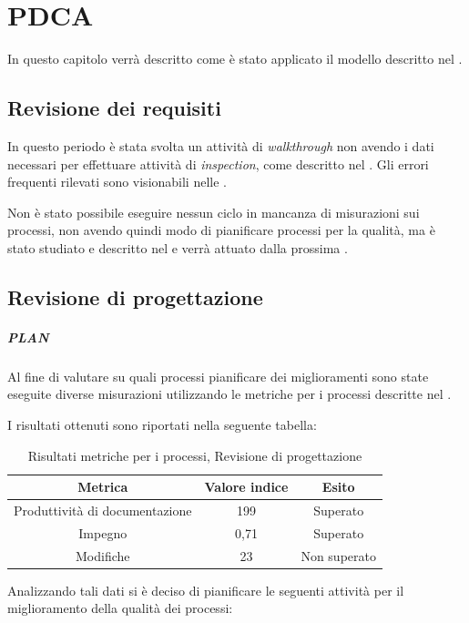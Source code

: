 \section{PDCA}
\label{appendiceQualità}
In questo capitolo verrà descritto come è stato applicato il modello  descritto nel \PianoDiQualifica.

\subsection{Revisione dei requisiti}

In questo periodo è stata svolta un attività di \emph{walkthrough} non avendo i dati necessari per effettuare attività di \emph{inspection}, come descritto nel \PianoDiQualifica. Gli errori frequenti rilevati sono visionabili nelle \NormeDiProgetto.

Non è stato possibile eseguire nessun ciclo  in mancanza di misurazioni sui processi, non avendo quindi modo di pianificare processi per la qualità, ma è stato studiato e descritto nel \PianoDiQualifica{} e verrà attuato dalla prossima .

\subsection{Revisione di progettazione}

\subparagraph{PLAN}

Al fine di valutare su quali processi pianificare dei miglioramenti sono state eseguite diverse misurazioni utilizzando le metriche per i processi descritte nel \PianoDiQualifica{}.

I risultati ottenuti sono riportati nella seguente tabella:

\begin{table}[H]
\centering
\begin{tabular}{ | c | c | c | }
\hline
\textbf{Metrica} & \textbf{Valore indice} & \textbf{Esito} \\
\hline
Produttività di documentazione & 199 & Superato \\
\hline
Impegno & 0,71 & Superato \\
\hline
Modifiche & 23 & Non superato \\
\hline
\end{tabular}
\caption{Risultati metriche per i processi, Revisione di progettazione}
\end{table}

Analizzando tali dati si è deciso di pianificare le seguenti attività per il miglioramento della qualità dei processi:

